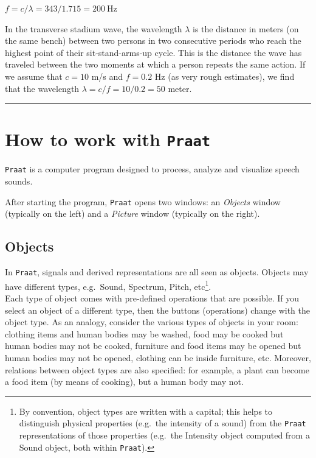 \documentclass[
]{book}
\begin{document}
\(f = c / \lambda = 343 / 1.715 = 200\ \textrm{Hz}\)

In the transverse stadium wave, the wavelength \(\lambda\) is the distance in meters (on the same bench) between two persons in two consecutive periods who reach the highest point of their sit-stand-arms-up cycle. This is the distance the wave has traveled between the two moments at which a person repeats the same action. If we assume that \(c=10\) m/s and \(f=0.2\) Hz (as very rough estimates), we find that the wavelength \(\lambda=c/f=10/0.2=50\) meter.

\begin{center}\rule{0.5\linewidth}{0.5pt}\end{center}

\label{box-praatintro}
\section{\texorpdfstring{How to work with \texttt{Praat}}{How to work with Praat}}\label{sec:praatintro}

\texttt{Praat} is a computer program designed to process, analyze and visualize speech sounds.

After starting the program, \texttt{Praat} opens two windows: an \emph{Objects} window (typically on the left) and a \emph{Picture} window (typically on the right).

\subsection*{Objects}\label{objects}

In \texttt{Praat}, signals and derived representations are all seen as objects. Objects may have different types, e.g.~Sound, Spectrum, Pitch, etc\footnote{By convention, object types are written with a capital; this helps to distinguish physical properties (e.g.~the intensity of a sound) from the \texttt{Praat} representations of those properties (e.g.~the Intensity object computed from a Sound object, both within \texttt{Praat}).}.\\
Each type of object comes with pre-defined operations that are possible. If you select an object of a different type, then the buttons (operations) change with the object type.
As an analogy, consider the various types of objects in your room: clothing items and human bodies may be washed, food may be cooked but human bodies may not be cooked, furniture and food items may be opened but human bodies may not be opened, clothing can be inside furniture, etc. Moreover, relations between object types are also specified: for example, a plant can become a food item (by means of cooking), but a human body may not.
\end{document}
